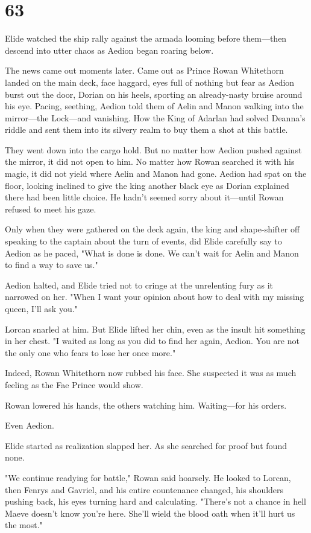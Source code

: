 
\chapter{63}

Elide watched the ship rally against the armada looming before them---then descend into utter chaos as Aedion began roaring below.

The news came out moments later.
Came out as Prince Rowan Whitethorn landed on the main deck, face haggard, eyes full of nothing but fear as Aedion burst out the door, Dorian on his heels, sporting an already-nasty bruise around his eye.
Pacing, seething, Aedion told them of Aelin and Manon walking into the mirror---the Lock---and vanishing.
How the King of Adarlan had solved Deanna's riddle and sent them into its silvery realm to buy them a shot at this battle.

They went down into the cargo hold.
But no matter how Aedion pushed against the mirror, it did not open to him.
No matter how Rowan searched it with his magic, it did not yield where Aelin and Manon had gone.
Aedion had spat on the floor, looking inclined to give the king another black eye as Dorian explained there had been little choice.
He hadn't seemed sorry about it---until Rowan refused to meet his gaze.

Only when they were gathered on the deck again, the king and shape-shifter off speaking to the captain about the turn of events, did Elide carefully say to Aedion as he paced, "What is done is done.
We can't wait for Aelin and Manon to find a way to save us."

Aedion halted, and Elide tried not to cringe at the unrelenting fury as it narrowed on her.
"When I want your opinion about how to deal with my missing queen, I'll ask you."

Lorcan snarled at him.
But Elide lifted her chin, even as the insult hit something in her chest.
"I waited as long as you did to find her again, Aedion.
You are not the only one who fears to lose her once more."

Indeed, Rowan Whitethorn now rubbed his face.
She suspected it was as much feeling as the Fae Prince would show.

Rowan lowered his hands, the others watching him.
Waiting---for his orders.

Even Aedion.

Elide started as realization slapped her.
As she searched for proof but found none.

"We continue readying for battle," Rowan said hoarsely.
He looked to Lorcan, then Fenrys and Gavriel, and his entire countenance changed, his shoulders pushing back, his eyes turning hard and calculating.
"There's not a chance in hell Maeve doesn't know you're here.
She'll wield the blood oath when it'll hurt us the most."


